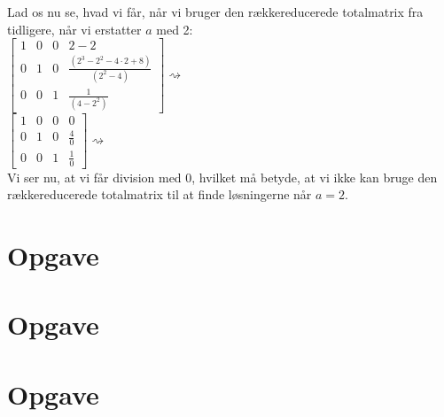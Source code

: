 \documentclass[a4paper,12pt]{article}
\begin{document}
Lad os nu se, hvad vi får, når vi bruger den rækkereducerede totalmatrix fra tidligere, når vi erstatter $a$ med 2:\\

$\left[\begin{array}{ccc|c}
    1 & 0 & 0 & 2-2 \\
    0 & 1 & 0 & \frac{(2^3 - 2^2 - 4\cdot 2 + 8)}{(2^2 - 4)} \\
    0 & 0 & 1 & \frac{1}{(4-2^2)}
\end{array}\right]
\rightsquigarrow$\\

$\left[\begin{array}{ccc|c}
    1 & 0 & 0 & 0 \\
    0 & 1 & 0 & \frac{4}{0} \\
    0 & 0 & 1 & \frac{1}{0}
\end{array}\right]
\rightsquigarrow$\\

Vi ser nu, at vi får division med 0, hvilket må betyde, at vi ikke kan bruge den rækkereducerede totalmatrix til at finde løsningerne når $a=2$.\\

\subsection{}


\section[Opgave]{Opgave}
\subsection{}


\subsection{}


\subsection{}


\subsection{}


\section[Opgave]{Opgave}
\subsection{}


\subsection{}


\subsection{}


\section[Opgave]{Opgave}
\end{document}
